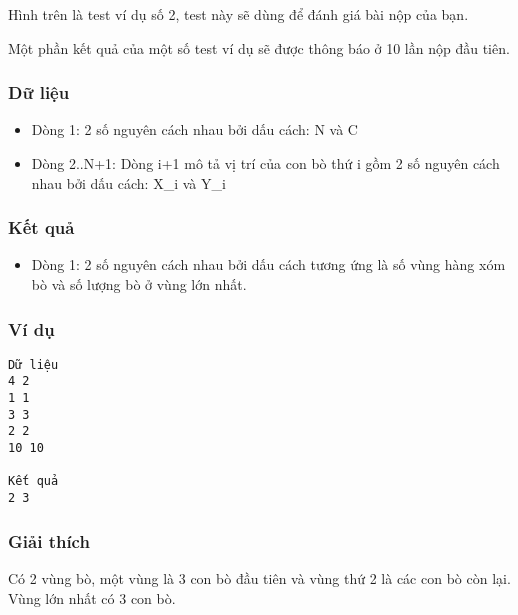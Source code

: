    Hình trên là test ví dụ số 2, test này sẽ dùng để đánh giá  bài nộp của bạn.  

   Một phần kết quả của một số test ví dụ sẽ được thông báo ở 10  lần nộp đầu tiên.  

\subsubsection{   Dữ liệu  }
\begin{itemize}
	\item     Dòng 1: 2 số nguyên cách nhau bởi dấu cách: N và C   
	\item     Dòng 2..N+1: Dòng i+1 mô tả vị trí của con bò thứ i gồm 2 số nguyên cách nhau bởi dấu cách: X\_i và Y\_i   
\end{itemize}

\subsubsection{   Kết quả  }
\begin{itemize}
	\item     Dòng 1: 2 số nguyên cách nhau bởi dấu cách tương ứng là số   vùng hàng xóm bò và số lượng bò ở vùng lớn nhất.   
\end{itemize}

\subsubsection{   Ví dụ  }
\begin{verbatim}
Dữ liệu
4 2
1 1
3 3
2 2
10 10

Kết quả
2 3
\end{verbatim}

\subsubsection{   Giải thích  }

   Có 2 vùng bò, một vùng là 3 con bò đầu tiên và vùng thứ 2 là các con bò còn lại. Vùng lớn nhất có 3 con bò.  
